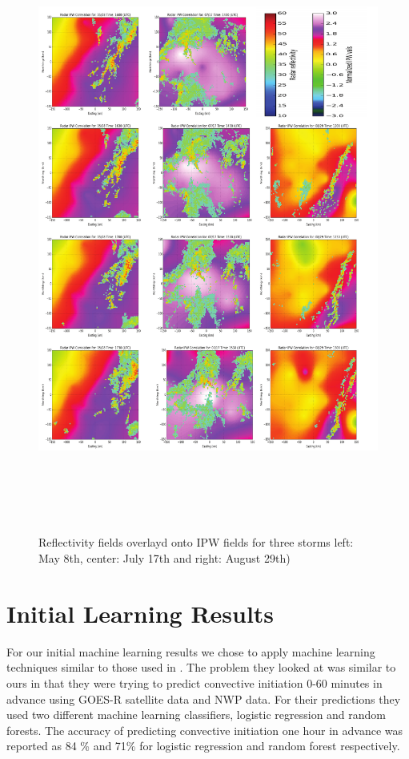 \documentclass[proposal]{umassthesis}
\begin{document}
{\begin{figure}[!h]
\begin{center}
\includegraphics[width = 15cm,height = 20cm]{RadarIPWProposal}
\caption{Reflectivity fields overlayd onto IPW fields for three storms left: May 8th, center: July 17th and right: August 29th)}\label{fig:ipw_radar}
\end{center}
\end{figure}

\chapter{Initial Learning Results}

For our initial machine learning results we chose to apply machine learning techniques similar to those used in \cite{mecikalski2015probabilistic}. The problem they looked at was similar to ours in that they were trying to predict convective initiation 0-60 minutes in advance using GOES-R satellite data and NWP data. For their predictions they used two different machine learning classifiers, logistic regression and random forests. The accuracy of predicting convective initiation one hour in advance was reported as 84 \% and 71\% for logistic regression and random forest respectively.

}
\end{document}
